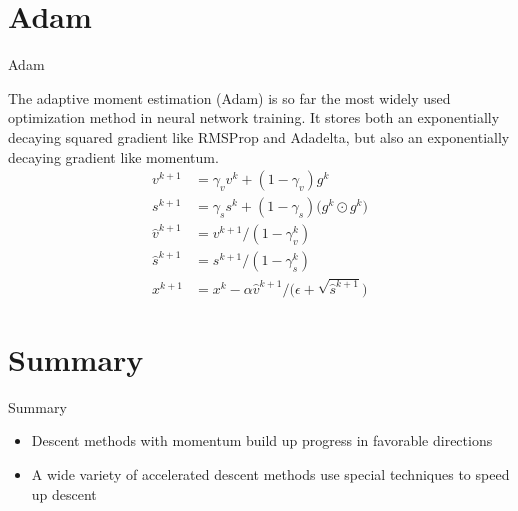 \documentclass{beamer}
\begin{document}
\section{Adam}
\begin{frame}{Adam}

The adaptive moment estimation (Adam) is so far the most widely used optimization method in neural network training.
It stores both an exponentially decaying squared gradient like RMSProp and Adadelta, but also an exponentially decaying gradient like momentum.
\begin{equation*}
 \begin{split}
    v^{k+1} &= \gamma_v v^k + (1-\gamma_v) g^k \\
    s^{k+1} &= \gamma_s s^k + (1-\gamma_s) \bigg(g^k \odot g^k \bigg)\\
    \hat{v}^{k+1} &= v^{k+1}/(1-\gamma_v^k)\\
    \hat{s}^{k+1} &= s^{k+1}/(1-\gamma_s^k)\\
    x^{k+1} &= x^k - \alpha \hat{v}^{k+1}/\bigg(\epsilon + \sqrt{\hat{s}^{k+1}}\bigg)
 \end{split}
\end{equation*}


\end{frame}


\section{Summary}
\begin{frame}{Summary}
    \begin{itemize}
        \item Descent methods with momentum build up progress in favorable directions
        \item A wide variety of accelerated descent methods use special techniques to speed up descent
    \end{itemize}
\end{frame}
\end{document}
